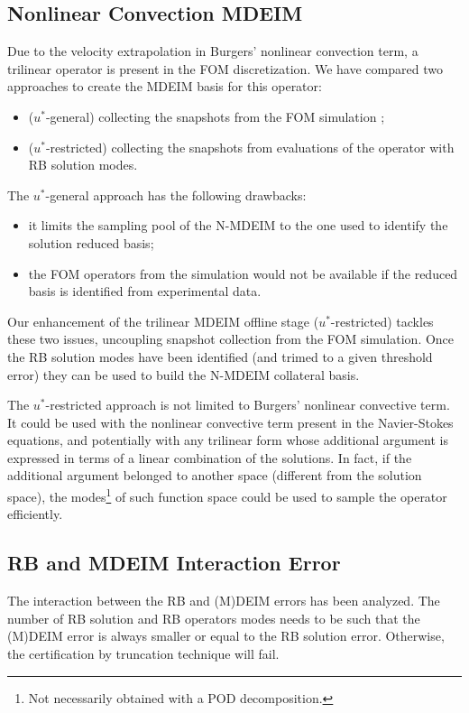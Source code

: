 \documentclass[thesis.tex]{subfiles}
\begin{document}
\subsection{Nonlinear Convection MDEIM}
Due to the velocity extrapolation in Burgers' nonlinear convection term,
a trilinear operator is present in the FOM discretization.
We have compared two approaches to create the MDEIM basis for this operator:
\begin{itemize}
    \item (\mbox{$u^{*}$-general}) collecting the snapshots from the FOM simulation \cite{Santo_Manzoni_2019};
    \item (\mbox{$u^{*}$-restricted}) collecting the snapshots from evaluations of the operator with RB solution modes.
\end{itemize}
The \mbox{$u^{*}$-general} approach has the following drawbacks:
\begin{itemize}
    \item it limits the sampling pool of the \mbox{N-MDEIM} to 
    the one used to identify the solution reduced basis;
    \item the FOM operators from the simulation would not be available 
    if the reduced basis is identified from experimental data.
\end{itemize}
Our enhancement of the trilinear MDEIM offline stage (\mbox{$u^{*}$-restricted})
tackles these two issues, uncoupling snapshot collection from the FOM simulation.
Once the RB solution modes have been identified 
(and trimed to a given threshold error)
they can be used to build the \mbox{N-MDEIM} collateral basis.

The \mbox{$u^{*}$-restricted} approach is not limited to Burgers' nonlinear convective term.
It could be used with the nonlinear convective term present in the Navier-Stokes equations,
and potentially with any trilinear form whose additional argument is expressed
in terms of a linear combination of the solutions.
In fact, if the additional argument belonged to another space (different from the solution space),
the modes\footnote{Not necessarily obtained with a POD decomposition.} of such function space could be used to sample the operator efficiently.

\subsection{RB and MDEIM Interaction Error}
The interaction between the RB and (M)DEIM errors has been analyzed.
The number of RB solution and RB operators modes needs to be such that
the (M)DEIM error is always smaller or equal to the RB solution error.
Otherwise, the certification by truncation technique will fail.
\end{document}
